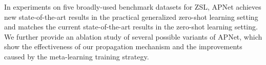 \documentclass[letterpaper]{article} %
\begin{document}

In experiments on five broadly-used benchmark datasets for ZSL, APNet achieves new state-of-the-art results in the practical generalized zero-shot learning setting and matches the current state-of-the-art results in the zero-shot learning setting. 
We further provide an ablation study of several possible variants of APNet, which show the effectiveness of our propagation mechanism and the improvements caused by the meta-learning training strategy.
\end{document}
